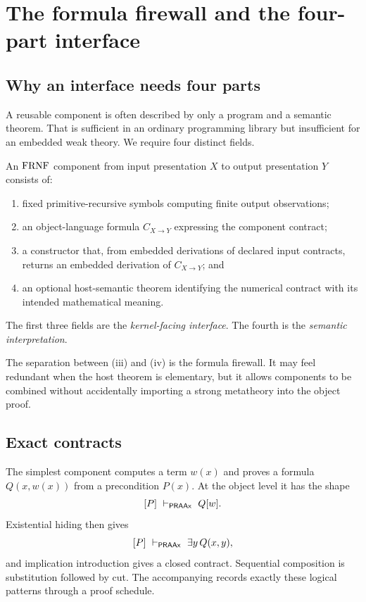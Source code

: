\section{The formula firewall and the four-part interface}
\label{sec:firewall}

\subsection{Why an interface needs four parts}

A reusable component is often described by only a program and a semantic theorem.
That is sufficient in an ordinary programming library but insufficient for an
embedded weak theory.  We require four distinct fields.

\begin{definition}
An \(\mathrm{FRNF}\) component from input presentation \(X\) to output presentation \(Y\)
consists of:
\begin{enumerate}[label=(\roman*),leftmargin=2.4em]
\item fixed primitive-recursive symbols computing finite output observations;
\item an object-language formula \(C_{X\to Y}\) expressing the component contract;
\item a constructor that, from embedded derivations of declared input contracts,
returns an embedded derivation of \(C_{X\to Y}\); and
\item an optional host-semantic theorem identifying the numerical contract with its
intended mathematical meaning.
\end{enumerate}
The first three fields are the \emph{kernel-facing interface}.  The fourth is the
\emph{semantic interpretation}.
\end{definition}

The separation between (iii) and (iv) is the formula firewall.  It may feel redundant
when the host theorem is elementary, but it allows components to be combined without
accidentally importing a strong metatheory into the object proof.

\subsection{Exact contracts}

The simplest component computes a term \(w(x)\) and proves a formula
\(Q(x,w(x))\) from a precondition \(P(x)\).  At the object level it has the shape
\[
    [P]\ \vdash_{\PRAAx}\ Q[w].
\]
Existential hiding then gives
\[
    [P]\ \vdash_{\mathsf{PRAAx}}\ \exists y\,Q(x,y),
\]
and implication introduction gives a closed contract.  Sequential composition is
substitution followed by cut.  The accompanying
 records exactly these logical patterns through a proof
schedule.

